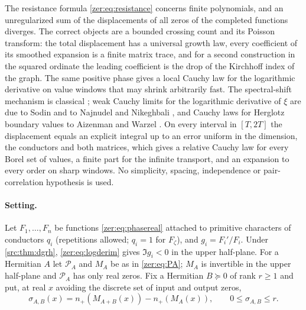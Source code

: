 The resistance formula \eqref{zer:eq:resistance} concerns finite polynomials, and an unregularized
sum of the displacements of all zeros of the completed functions diverges. The correct objects are
a bounded crossing count and its Poisson transform: the total displacement has a universal growth
law, every coefficient of its smoothed expansion is a finite matrix trace, and for a second
construction in the squared ordinate the leading coefficient is the drop of the Kirchhoff index of
the graph. The same positive phase gives a local Cauchy law for the logarithmic derivative on value
windows that may shrink arbitrarily fast. The spectral-shift mechanism is classical
\cite{BehrndtGesztesyNakamura2018Spectral,Reiffenstein2022Interlacing}; weak Cauchy limits for the
logarithmic derivative of $\xi$ are due to Sodin and to Najnudel and Nikeghbali
\cite{Sodin2018Critical,NajnudelNikeghbali2026Cauchy}, and Cauchy laws for Herglotz boundary values
to Aizenman and Warzel \cite{AizenmanWarzel2015Cauchy}. On every interval in $[T,2T]$ the displacement
equals an explicit integral up to an error uniform in the dimension, the conductors and both matrices,
which gives a relative Cauchy law for every Borel set of values, a finite part for the infinite transport,
and an expansion to every order on sharp windows. No simplicity, spacing, independence or
pair-correlation hypothesis is used.

\paragraph{Setting.}
Let $F_1,\dots,F_n$ be functions \eqref{zer:eq:phasereal} attached to primitive characters of
conductors $q_i$ (repetitions allowed; $q_i=1$ for $F_\zeta$), and $g_i=F_i'/F_i$. Under
\cref{src:thm:dgrh}, \eqref{zer:eq:logderim} gives $\Im g_i<0$ in the upper half-plane. For a
Hermitian $A$ let $\mathcal P_A$ and $M_A$ be as in \eqref{zer:eq:PA}; $M_A$ is invertible in the upper
half-plane and $\mathcal P_A$ has only real zeros. Fix a Hermitian $B\succeq0$ of rank $r\ge1$ and put,
at real $x$ avoiding the discrete set of input and output zeros,
\begin{equation}\label{zer:eq:shift}
 \sigma_{A,B}(x)=n_+(M_{A+B}(x))-n_+(M_A(x)),\qquad 0\le\sigma_{A,B}\le r .
\end{equation}

